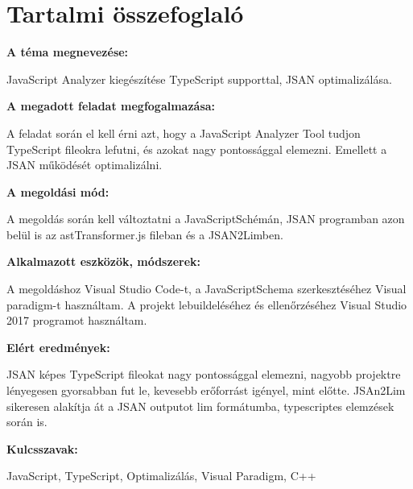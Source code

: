\chapter*{Tartalmi összefoglaló}

\noindent\textbf{A téma megnevezése:}

JavaScript Analyzer kiegészítése TypeScript supporttal, JSAN optimalizálása.

\noindent\textbf{A megadott feladat megfogalmazása:}

A feladat során el kell érni azt, hogy a JavaScript Analyzer Tool tudjon TypeScript fileokra lefutni, és azokat nagy pontossággal elemezni. 
Emellett a JSAN működését optimalizálni.

\noindent\textbf{A megoldási mód:}

A megoldás során kell változtatni a JavaScriptSchémán, JSAN programban azon belül is az astTransformer.js fileban és a JSAN2Limben.

\noindent\textbf{Alkalmazott eszközök, módszerek:}

A megoldáshoz Visual Studio Code-t, a JavaScriptSchema szerkesztéséhez Visual paradigm-t használtam.
A projekt lebuildeléséhez és ellenőrzéséhez Visual Studio 2017 programot használtam.

\noindent\textbf{Elért eredmények:}

JSAN képes TypeScript fileokat nagy pontossággal elemezni, nagyobb projektre lényegesen gyorsabban fut le, kevesebb erőforrást igényel, mint előtte.
JSAn2Lim sikeresen alakítja át a JSAN outputot lim formátumba, typescriptes elemzések során is.

\noindent\textbf{Kulcsszavak:}

JavaScript, TypeScript, Optimalizálás, Visual Paradigm, C++
